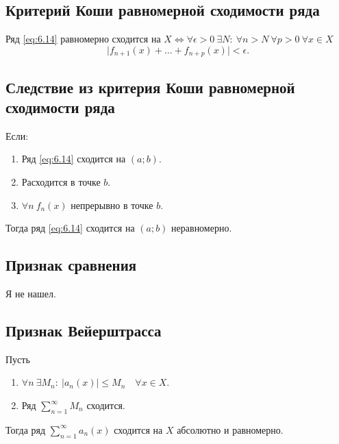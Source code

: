 \subsection{Критерий Коши равномерной сходимости ряда}

\begin{theorem}
    Ряд \ref{eq:6.14} равномерно сходится на $X \iff \forall \epsilon > 0 \ \exists N: \ \forall n > N \ \forall p > 0 \ \forall x \in X$
    \[
        \big|f_{n+1}(x) + \ldots + f_{n+p}(x)\big| < \epsilon.
    \]
\end{theorem}

\newpage

\subsection{Следствие из критерия Коши равномерной сходимости ряда}

\begin{corollary}
    Если:
    \begin{enumerate}
        \item Ряд \ref{eq:6.14} сходится на $(a;b)$.
        \item Расходится в точке $b$.
        \item $\forall n \ f_n(x)$ непрерывно в точке $b$.
    \end{enumerate}

    Тогда ряд \ref{eq:6.14} сходится на $(a;b)$ неравномерно.
\end{corollary}

\subsection{Признак сравнения}

Я не нашел.

\subsection{Признак Вейерштрасса}

\begin{corollary}
    Пусть
    \begin{enumerate}
        \item $\forall n \ \exists M_n: \ \big|a_n(x)\big| \leqslant M_n \quad \forall x \in X $.
        \item Ряд $\sum_{n=1}^{\infty} M_n$ сходится.
    \end{enumerate}

    Тогда ряд $\sum_{n=1}^{\infty}a_n(x)$ сходится на $X$ абсолютно и равномерно.
\end{corollary}

